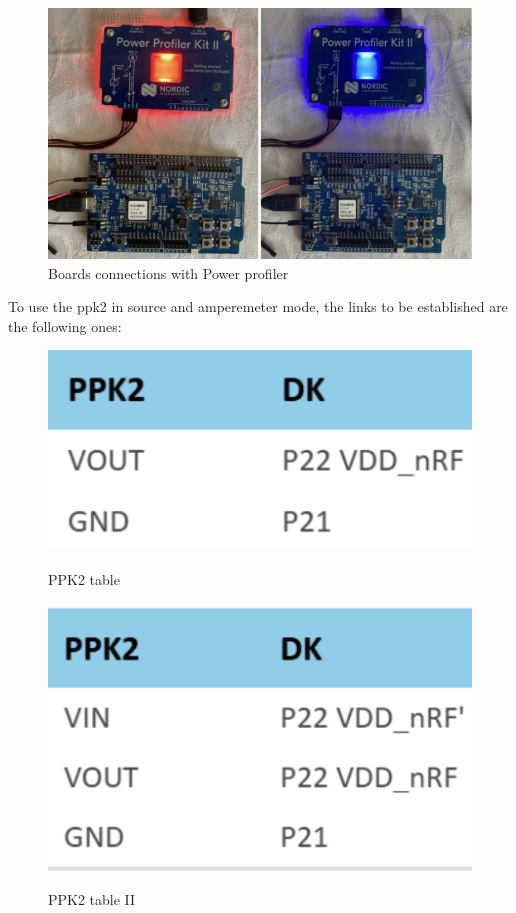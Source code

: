 \documentclass{Configuration_Files/PoliMi3i_thesis}
\begin{document}
\begin{figure}[H]
    \centering
    \includegraphics[scale=0.6]{Test_Procedure/8.png}
    \caption{Boards connections with Power profiler}
    \label{direct_communication_board_PC_8}
\end{figure}

To use the ppk2 in source and amperemeter mode, the links to be established are the following ones:

\begin{figure}[H]
    \centering
    \includegraphics[scale=0.6]{Test_Procedure/9.png}
    \label{direct_communication_board_PC_9}
    \caption{PPK2 table}
\end{figure}

\begin{figure}[H]
    \centering
    \includegraphics[scale=0.6]{Test_Procedure/10.png}
    \label{direct_communication_board_PC_10}
    \caption{PPK2 table II}
\end{figure}
\end{document}
